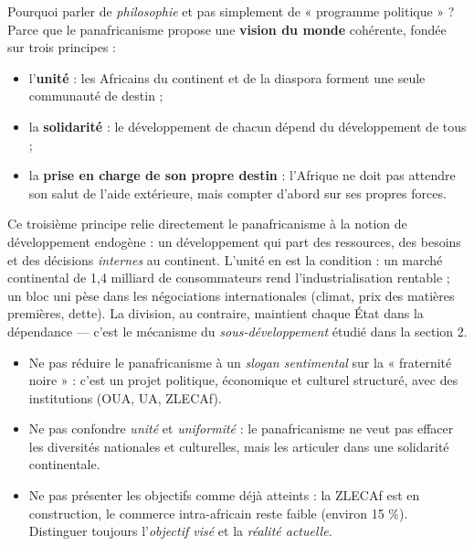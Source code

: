 \documentclass[11pt]{article}
\newcommand{\cle}[1]{{\popxbold\color{popdark}#1}}
\begin{document}
Pourquoi parler de \emph{philosophie} et pas simplement de « programme politique » ? Parce que le panafricanisme propose une \textbf{vision du monde} cohérente, fondée sur trois principes :
\begin{itemize}
\item l'\textbf{unité} : les Africains du continent et de la diaspora forment une seule communauté de destin ;
\item la \textbf{solidarité} : le développement de chacun dépend du développement de tous ;
\item la \textbf{prise en charge de son propre destin} : l'Afrique ne doit pas attendre son salut de l'aide extérieure, mais compter d'abord sur ses propres forces.
\end{itemize}

Ce troisième principe relie directement le panafricanisme à la notion de \cle{développement endogène} : un développement qui part des ressources, des besoins et des décisions \emph{internes} au continent. L'unité en est la condition : un marché continental de 1,4 milliard de consommateurs rend l'industrialisation rentable ; un bloc uni pèse dans les négociations internationales (climat, prix des matières premières, dette). La division, au contraire, maintient chaque État dans la dépendance — c'est le mécanisme du \emph{sous-développement} étudié dans la section 2.

\begin{attention}
\begin{itemize}
\item Ne pas réduire le panafricanisme à un \emph{slogan sentimental} sur la « fraternité noire » : c'est un projet politique, économique et culturel structuré, avec des institutions (OUA, UA, ZLECAf).
\item Ne pas confondre \emph{unité} et \emph{uniformité} : le panafricanisme ne veut pas effacer les diversités nationales et culturelles, mais les articuler dans une solidarité continentale.
\item Ne pas présenter les objectifs comme déjà atteints : la ZLECAf est en construction, le commerce intra-africain reste faible (environ 15 \%). Distinguer toujours l'\emph{objectif visé} et la \emph{réalité actuelle}.
\end{itemize}
\end{attention}
\end{document}
